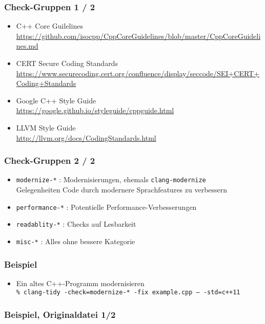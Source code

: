 \documentclass[aspectratio=169]{beamer}
\begin{document}
\begin{frame}
  \frametitle{Check-Gruppen 1 / 2}
  \begin{itemize}
  \item C++ Core Guilelines\\
    \qquad \url{https://github.com/isocpp/CppCoreGuidelines/blob/master/CppCoreGuidelines.md}
  \item CERT Secure Coding Standards\\
    \qquad \url{https://www.securecoding.cert.org/confluence/display/seccode/SEI+CERT+Coding+Standards}
  \item Google C++ Style Guide\\
    \qquad \url{https://google.github.io/styleguide/cppguide.html}
  \item LLVM Style Guide\\
    \qquad \url{http://llvm.org/docs/CodingStandards.html}
  \end{itemize}
\end{frame}

\begin{frame}
  \frametitle{Check-Gruppen 2 / 2}
  \begin{itemize}
  \item \texttt{modernize-*} : Modernisierungen, ehemals \texttt{clang-modernize}\\
    Gelegenheiten Code durch modernere Sprachfeatures zu verbessern
  \item \texttt{performance-*} : Potentielle Performance-Verbesserungen
  \item \texttt{readablity-*} : Checks auf Lesbarkeit
  \item \texttt{misc-*} : Alles ohne bessere Kategorie
  \end{itemize}
\end{frame}

\begin{frame}[fragile]
  \frametitle{Beispiel}
  \begin{itemize}
  \item Ein altes C++-Programm modernisieren\\
    \texttt{\% clang-tidy -check=modernize-* -fix example.cpp -- -std=c++11}
  \end{itemize}
\end{frame}

\begin{frame}[fragile]
  \frametitle{Beispiel, Originaldatei 1/2}

\end{frame}
\end{document}
